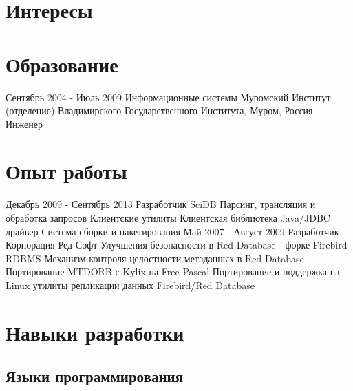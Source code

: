 \documentclass[11pt,a4paper]{moderncv}
\begin{document}
\maketitle

\section{Интересы}
  
\section{Образование}
\cventry
  {Сентябрь 2004 - Июль 2009}
  {Информационные системы}
  {Муромский Институт (отделение) Владимирского Государственного Института, Муром, Россия}
  {}{}
  {Инженер}

\section{Опыт работы}
\cventry
  {Декабрь 2009 - Сентябрь 2013}
  {Разработчик}
  {SciDB}
  {}{}
  {Парсинг, трансляция и обработка запросов\newline{}
   Клиентские утилиты\newline{}
   Клиентская библиотека\newline{}
   Java/JDBC драйвер\newline{}
   Система сборки и пакетирования}
\cventry
  {Май 2007 - Август 2009}
  {Разработчик}
  {Корпорация Ред Софт}
  {}{}
  {
    Улучшения безопасности в Red Database - форке Firebird RDBMS\newline{}
    Механизм контроля целостности метаданных в Red Database\newline{}
    Портирование MTDORB с Kylix на Free Pascal\newline{}
    Портирование и поддержка на Linux утилиты репликации данных Firebird/Red Database
  }

\section{Навыки разработки}
\subsection{Языки программирования}
\end{document}
